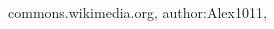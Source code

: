 \renewcommand\bibname{References}
\begin{thebibliography}{99}
 commons.wikimedia.org, author:Alex1011, 
\end{thebibliography}
